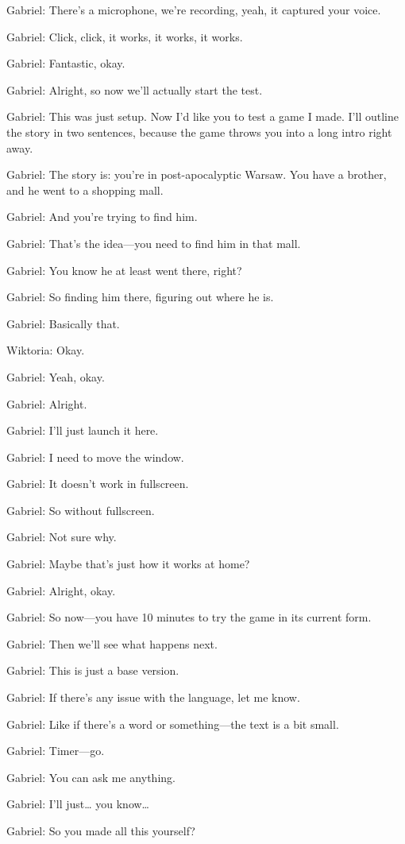 Gabriel: There’s a microphone, we’re recording, yeah, it captured your voice.

Gabriel: Click, click, it works, it works, it works.

Gabriel: Fantastic, okay.

Gabriel: Alright, so now we’ll actually start the test.

Gabriel: This was just setup. Now I’d like you to test a game I made. I’ll outline the story in two sentences, because the game throws you into a long intro right away.

Gabriel: The story is: you’re in post-apocalyptic Warsaw. You have a brother, and he went to a shopping mall.

Gabriel: And you’re trying to find him.

Gabriel: That’s the idea—you need to find him in that mall.

Gabriel: You know he at least went there, right?

Gabriel: So finding him there, figuring out where he is.

Gabriel: Basically that.

Wiktoria: Okay.

Gabriel: Yeah, okay.

Gabriel: Alright.

Gabriel: I’ll just launch it here.

Gabriel: I need to move the window.

Gabriel: It doesn’t work in fullscreen.

Gabriel: So without fullscreen.

Gabriel: Not sure why.

Gabriel: Maybe that’s just how it works at home?

Gabriel: Alright, okay.

Gabriel: So now—you have 10 minutes to try the game in its current form.

Gabriel: Then we’ll see what happens next.

Gabriel: This is just a base version.

Gabriel: If there’s any issue with the language, let me know.

Gabriel: Like if there’s a word or something—the text is a bit small.

Gabriel: Timer—go.

Gabriel: You can ask me anything.

Gabriel: I’ll just… you know…

Gabriel: So you made all this yourself?

